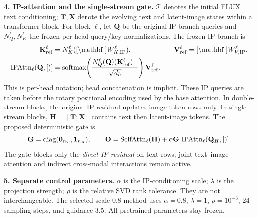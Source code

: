 \textbf{4. IP-attention and the single-stream gate.}
$\mathcal T$ denotes the initial FLUX text conditioning; $\mathbf T,\mathbf X$
denote the evolving text and latent-image states within a transformer block.
For block $\ell$, let $\mathbf Q$ be the original IP-branch queries and
$N_Q^{\ell},N_K^{\ell}$ the frozen per-head query/key normalizations.
The frozen IP branch is
\begin{equation}
\begin{aligned}
\mathbf K_{\mathrm{ref}}^{\ell}
 &=N_K^{\ell}(\Cref\mathbf W_{K,\mathrm{IP}}^{\ell}),
&\quad \mathbf V_{\mathrm{ref}}^{\ell}
 &=\Cref\mathbf W_{V,\mathrm{IP}}^{\ell},\\
\IPAttn_{\ell}(\mathbf Q,\Cref)
 &=\operatorname{softmax}\!\left(
 \frac{N_Q^{\ell}(\mathbf Q)(\mathbf K_{\mathrm{ref}}^{\ell})^{\top}}{\sqrt{d_h}}
 \right)\mathbf V_{\mathrm{ref}}^{\ell}.
\end{aligned}
\end{equation}
This is per-head notation; head concatenation is implicit. These IP queries are
taken before the rotary positional encoding used by the base attention.
In double-stream blocks, the original IP residual updates image-token rows only.
In single-stream blocks, $\mathbf H=[\mathbf T;\mathbf X]$ contains text then
latent-image tokens. The proposed deterministic gate is
\begin{equation}
\mathbf G=\operatorname{diag}(\mathbf 0_{n_T},\mathbf 1_{n_X}),\qquad
\mathbf O=\SelfAttn_{\ell}(\mathbf H)
 +\alpha\mathbf G\,\IPAttn_{\ell}(\mathbf Q_H,\Cref).
\end{equation}
The gate blocks only the \emph{direct IP residual} on text rows; joint text--image
attention and indirect cross-modal interactions remain active.

\textbf{5. Separate control parameters.}
$\alpha$ is the IP-conditioning scale; $\lambda$ is the projection strength;
$\rho$ is the relative SVD rank tolerance. They are not interchangeable.
The selected scale-0.8 method uses $\alpha=0.8$, $\lambda=1$, $\rho=10^{-3}$,
24 sampling steps, and guidance 3.5. All pretrained parameters stay frozen.
